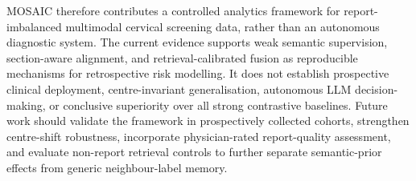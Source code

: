 \documentclass[11pt, a4paper]{article}
\theoremstyle{plain}
\theoremstyle{definition}
\begin{document}
MOSAIC therefore contributes a controlled analytics framework for report-imbalanced multimodal cervical screening data, rather than an autonomous diagnostic system. The current evidence supports weak semantic supervision, section-aware alignment, and retrieval-calibrated fusion as reproducible mechanisms for retrospective risk modelling. It does not establish prospective clinical deployment, centre-invariant generalisation, autonomous LLM decision-making, or conclusive superiority over all strong contrastive baselines. Future work should validate the framework in prospectively collected cohorts, strengthen centre-shift robustness, incorporate physician-rated report-quality assessment, and evaluate non-report retrieval controls to further separate semantic-prior effects from generic neighbour-label memory.





\end{document}
